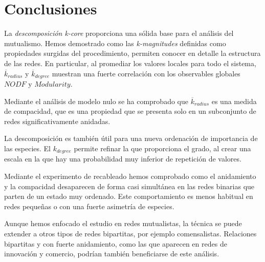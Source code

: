 \section{Conclusiones}

La \textit{descomposición k-core} proporciona una sólida base para el análisis del mutualismo. Hemos demostrado como las \textit{k-magnitudes} definidas como propiedades surgidas del procedimiento, permiten conocer en detalle la estructura de las redes. En particular, al promediar los valores locales para todo el sistema, $\overline {k}_{radius}$ y $\overline {k}_{degree}$ muestran una fuerte correlación con los observables globales $NODF$ y $Modularity$. 

Mediante el análisis de modelo nulo se ha comprobado que $\overline {k}_{radius}$ es una medida de compacidad, que es una propiedad que se presenta solo en un subconjunto de redes significativamente anidadas.

La descomposición es también útil para una nueva ordenación de importancia de las especies. El ${k}_{degree}$ permite refinar la que proporciona el grado, al crear una escala en la que hay una probabilidad muy inferior de repetición de valores.

Mediante el experimento de recableado hemos comprobado como el anidamiento y la compacidad desaparecen de forma casi simultánea en las redes binarias que parten de un estado muy ordenado. Este comportamiento es menos habitual en redes pequeñas o con una fuerte asimetría de especies.

Aunque hemos enfocado el estudio en redes mutualistas, la técnica se puede extender a otros tipos de redes bipartitas, por ejemplo comensalistas. Relaciones bipartitas y con fuerte anidamiento, como las que aparecen en redes de innovación y comercio, podrían también beneficiarse de este análisis.

